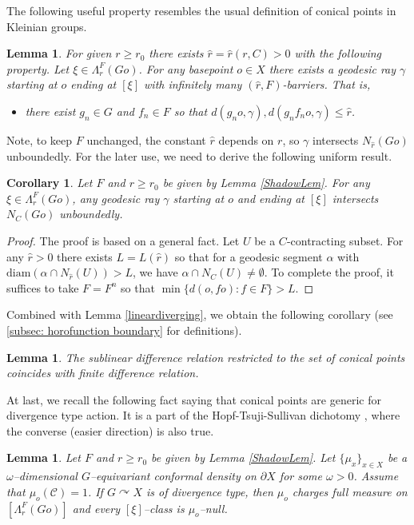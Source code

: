 \documentclass{amsart}
\newtheorem{cor}[thm]{Corollary}
\newtheorem{lem}[thm]{Lemma}
\theoremstyle{definition}
\theoremstyle{remark}
\newcommand{\act}{\curvearrowright}
\newcommand{\U}{ X}
\newcommand{\pU}{\partial{  X}}
\begin{document}
  
The following useful property \cite[Lemma 4.7]{YANG22} resembles the usual definition of conical points in Kleinian groups.
\begin{lem}\label{ConicalPointsLem}
For given $r\ge r_0$ there exists   $\hat r=\hat r(r,C)>0$ with the following property.  Let $\xi\in \Lambda_r^F(Go)$.  For any basepoint $o\in \U$ there exists a geodesic ray $\gamma$ starting at $o$ ending at $[\xi]$  with infinitely many $(\hat r, F)$-barriers.  That is, 
\begin{itemize}
    \item 
    there exist $g_n\in G$ and $f_n\in F$ so that  $d(g_no, \gamma), d(g_nf_no, \gamma)\le \hat r$.
\end{itemize} 
\end{lem}
Note, to keep $F$ unchanged, the constant $\hat r$ depends on $r$, so   $\gamma$ intersects $N_{\hat r}(Go)$ unboundedly. For the later use,  we need to derive the following uniform result. 
\begin{cor}\label{ConicalPointsIntersUnifNbhd}
Let $F$ and $r\ge r_0$ be given by Lemma \ref{ShadowLem}.
For any $\xi\in \Lambda_r^F(Go)$, any geodesic ray $\gamma$ starting at $o$ and ending at $[\xi]$ intersects $N_C(Go)$ unboundedly.    
\end{cor}
\begin{proof}
The proof is based on a general fact. Let $U$ be a $C$-contracting subset. For any $\hat r>0$ there exists $L=L(\hat r)$ so that for  a geodesic segment $\alpha$ with $\mathrm{diam}(\alpha\cap N_{\hat r}(U))>L$, we have $\alpha\cap N_C(U)\ne \emptyset$. To complete the proof, it suffices to take $F=F^n$ so that $\min\{d(o,fo): f\in F\}>L$. 
\end{proof}

Combined with Lemma \ref{lineardiverging}, we obtain   the following corollary (see \textsection \ref{subsec: horofunction boundary} for definitions).
\begin{lem}
The sublinear difference relation restricted to the set of conical points coincides with finite difference relation.
\end{lem} 
At last,  we recall the following fact saying that conical points are generic for divergence type action. It is a part of  the Hopf-Tsuji-Sullivan dichotomy \cite[Theorem 1.14]{YANG22}, where the converse (easier direction) is also true.
\begin{lem}\label{HSTLem}
Let $F$ and $r\ge r_0$ be given by Lemma \ref{ShadowLem}. Let $\{\mu_x\}_{x\in \U}$ be a $\omega$--dimensional $G$--equivariant conformal density on $\pU$ for some $\omega>0$. Assume that $\mu_o(\mathcal C)=1$.   If $G\act \U$ is of divergence type, then $\mu_o$ charges full measure on $[\Lambda_r^F(Go)]$ and every $[\xi]$--class is $\mu_o$--null.
\end{lem}
 
\end{document}
